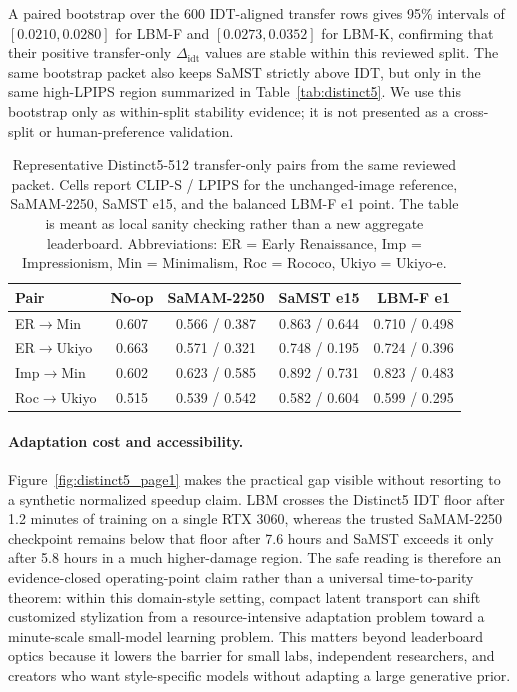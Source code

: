 \documentclass[letterpaper]{article}
\begin{document}
A paired bootstrap over the 600 IDT-aligned transfer rows gives 95\% intervals of $[0.0210, 0.0280]$ for LBM-F and $[0.0273, 0.0352]$ for LBM-K, confirming that their positive transfer-only $\Delta_{\mathrm{idt}}$ values are stable within this reviewed split. The same bootstrap packet also keeps SaMST strictly above IDT, but only in the same high-LPIPS region summarized in Table~\ref{tab:distinct5}. We use this bootstrap only as within-split stability evidence; it is not presented as a cross-split or human-preference validation.

\begin{table}[t]
\centering
\caption{Representative Distinct5-512 transfer-only pairs from the same reviewed packet. Cells report CLIP-S / LPIPS for the unchanged-image reference, SaMAM-2250, SaMST e15, and the balanced LBM-F e1 point. The table is meant as local sanity checking rather than a new aggregate leaderboard. Abbreviations: ER = Early Renaissance, Imp = Impressionism, Min = Minimalism, Roc = Rococo, Ukiyo = Ukiyo-e.}
\label{tab:distinct5pairs}
\scriptsize
\setlength{\tabcolsep}{3pt}
\begin{tabular}{@{}lcccc@{}}
\toprule
Pair & No-op & SaMAM-2250 & SaMST e15 & LBM-F e1 \\
\midrule
ER$\rightarrow$Min & 0.607 & 0.566 / 0.387 & 0.863 / 0.644 & 0.710 / 0.498 \\
ER$\rightarrow$Ukiyo & 0.663 & 0.571 / 0.321 & 0.748 / 0.195 & 0.724 / 0.396 \\
Imp$\rightarrow$Min & 0.602 & 0.623 / 0.585 & 0.892 / 0.731 & 0.823 / 0.483 \\
Roc$\rightarrow$Ukiyo & 0.515 & 0.539 / 0.542 & 0.582 / 0.604 & 0.599 / 0.295 \\
\bottomrule
\end{tabular}
\end{table}


\DistinctFiveTimingTableLeibniz

\paragraph{Adaptation cost and accessibility.}
Figure~\ref{fig:distinct5_page1} makes the practical gap visible without resorting to a synthetic normalized speedup claim. LBM crosses the Distinct5 IDT floor after 1.2 minutes of training on a single RTX 3060, whereas the trusted SaMAM-2250 checkpoint remains below that floor after 7.6 hours and SaMST exceeds it only after 5.8 hours in a much higher-damage region. The safe reading is therefore an evidence-closed operating-point claim rather than a universal time-to-parity theorem: within this domain-style setting, compact latent transport can shift customized stylization from a resource-intensive adaptation problem toward a minute-scale small-model learning problem. This matters beyond leaderboard optics because it lowers the barrier for small labs, independent researchers, and creators who want style-specific models without adapting a large generative prior.
\end{document}
